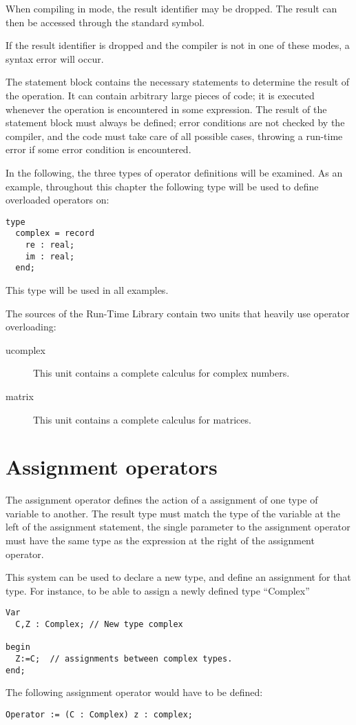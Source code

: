 \begin{remark}
When compiling in  mode, the result identifier may be dropped. 
The result can then be accessed through the standard  symbol.

If the result identifier is dropped and the compiler is not in one
of these modes, a syntax error will occur.
\end{remark}


The statement block contains the necessary statements to determine the
result of the operation. It can contain arbitrary large pieces of code;
it is executed whenever the operation is encountered in some expression.
The result of the statement block must always be defined; error conditions
are not checked by the compiler, and the code must take care of all possible
cases, throwing a run-time error if some error condition is encountered.

In the following, the three types of operator definitions will be examined.
As an example, throughout this chapter the following type will be used to
define overloaded operators on:
\begin{verbatim}
type
  complex = record
    re : real;
    im : real;
  end;
\end{verbatim}
This type will be used in all examples.

The sources of the Run-Time Library contain two units that heavily use
operator overloading:
\begin{description}
\item[ucomplex] This unit contains a complete calculus for complex numbers.
\item[matrix] This unit contains a complete calculus for matrices.
\end{description}

\section{Assignment operators}
The assignment operator defines the action of a assignment of one type of
variable to another. The result type must match the type of the variable
at the left of the assignment statement, the single parameter to the
assignment operator must have the same type as the expression at the
right of the assignment operator.

This system can be used to declare a new type, and define an assignment for
that type. For instance, to be able to assign a newly defined type ``Complex''
\begin{verbatim}
Var
  C,Z : Complex; // New type complex

begin
  Z:=C;  // assignments between complex types.
end;
\end{verbatim}
The following assignment operator would have to be defined:
\begin{verbatim}
Operator := (C : Complex) z : complex;
\end{verbatim}

